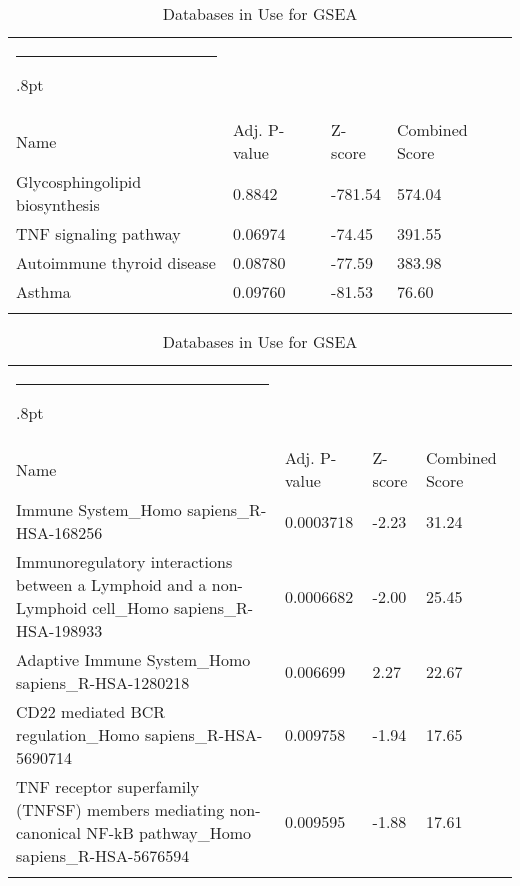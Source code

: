 \documentclass[3p,authoryear,preprint,12pt]{elsarticle}
\makeatletter
\def\hlinewd#1{%
  \noalign{\ifnum0=`}\fi\hrule \@height #1%
  \futurelet\reserved@a\@xhline}
\def\tbltoprule{\hlinewd{.8pt}\\[-12pt]}
\def\tblbottomrule{\noalign{\vspace*{6pt}}\hline\noalign{\vspace*{2pt}}}
\def\tblmidrule{\noalign{\vspace*{6pt}}\hline\noalign{\vspace*{2pt}}}
\makeatother
\begin{document}
\begin{table*}[!htbp]
	\caption{{Databases in Use for GSEA} }
	\label{tw-de478ae31cc6}
	\def\arraystretch{1}
	\ignorespaces 
	\centering 
	\begin{tabulary}{\linewidth}{p{\dimexpr.65\tabcolsep}p{\dimexpr.15\tabcolsep}p{\dimexpr.1\tabcolsep}p{\dimexpr.1\tabcolsep}}
		\tbltoprule Name & Adj. P-value & Z-score & Combined Score\\
		\tblmidrule
Glycosphingolipid biosynthesis & 0.8842 & -781.54 & 574.04 \\
TNF signaling pathway & 0.06974 & -74.45 & 391.55 \\
Autoimmune thyroid disease & 0.08780 & -77.59 & 383.98 \\
Asthma & 0.09760 & -81.53 & 76.60 \\
		\tblbottomrule
	\end{tabulary}\par 
\end{table*}
\begin{table*}[!htbp]
	\caption{{Databases in Use for GSEA} }
	\label{tw-de478ae31cc6}
	\def\arraystretch{1}
	\ignorespaces 
	\centering 
	\begin{tabulary}{\linewidth}{p{\dimexpr.65\tabcolsep}p{\dimexpr.15\tabcolsep}p{\dimexpr.1\tabcolsep}p{\dimexpr.1\tabcolsep}}
		\tbltoprule Name & Adj. P-value & Z-score & Combined Score\\
		\tblmidrule
Immune System\_Homo sapiens\_R-HSA-168256 & 0.0003718 & -2.23 & 31.24 \\
Immunoregulatory interactions between a Lymphoid and a non-Lymphoid cell\_Homo sapiens\_R-HSA-198933 & 0.0006682 & -2.00 & 25.45 \\
Adaptive Immune System\_Homo sapiens\_R-HSA-1280218 & 0.006699 & 2.27 & 22.67 \\
CD22 mediated BCR regulation\_Homo sapiens\_R-HSA-5690714 & 0.009758 & -1.94 & 17.65 \\
TNF receptor superfamily (TNFSF) members mediating non-canonical NF-kB pathway\_Homo sapiens\_R-HSA-5676594 & 0.009595 & -1.88 & 17.61 \\
		\tblbottomrule
	\end{tabulary}\par 
\end{table*}
\end{document}
